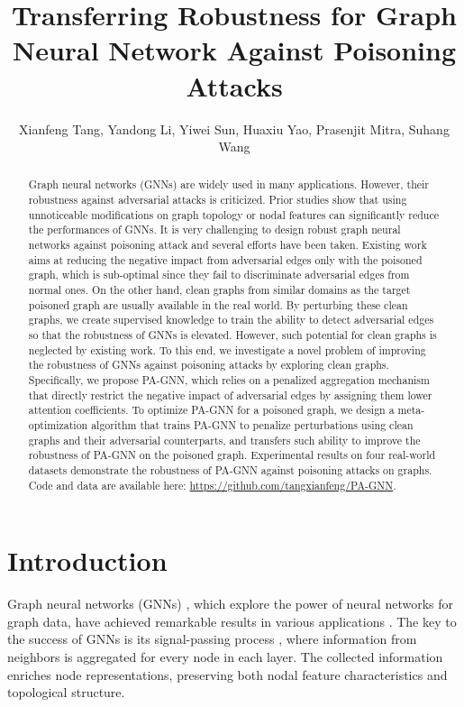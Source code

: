 \documentclass[sigconf]{acmart}
\title{Transferring Robustness for Graph Neural Network Against Poisoning Attacks}
\author{Xianfeng Tang, Yandong Li, Yiwei Sun, Huaxiu Yao, Prasenjit Mitra, Suhang Wang}\authornote{Corresponding Author.}
\affiliation{
\institution{Pennsylvania State University, University of Central Florida}
}
\affiliation{
  \institution{\{tangxianfeng, lyndon.leeseu\}@outlook.com  \{yus162, huy144, pum10, szw494\}@psu.edu}
}
\newcommand{\our}{{PA-GNN}\xspace}
\newcommand{\ours}{{PA-GNN}\xspace}
\begin{document}
\fancyhead{}
\begin{abstract}
Graph neural networks (GNNs) are widely used in many applications. 
However, their robustness against adversarial attacks is criticized. 
Prior studies show that using unnoticeable modifications on graph topology or nodal features can significantly reduce the performances of GNNs.
It is very challenging to design robust graph neural networks against poisoning attack and several efforts have been taken. 
Existing work aims at reducing the negative impact from adversarial edges only with the poisoned graph, which is sub-optimal since they fail to discriminate adversarial edges  from normal ones.
On the other hand, clean graphs from similar domains as the target poisoned graph are usually available in the real world. 
By perturbing these clean graphs, we create supervised knowledge to train the ability to detect adversarial edges so that the robustness of GNNs is elevated.
However, such potential for clean graphs is neglected by existing work.
To this end, we investigate a novel problem of improving the robustness of GNNs against poisoning attacks by exploring clean graphs.
Specifically, we propose \ours, which relies on a penalized aggregation mechanism that directly restrict the negative impact of adversarial edges by assigning them lower attention coefficients.
To optimize \ours for a poisoned graph, we design a meta-optimization algorithm that trains \ours to penalize perturbations using clean graphs and their adversarial counterparts, and transfers such ability to improve the robustness of \ours on the poisoned graph.
Experimental results on four real-world datasets demonstrate the robustness of \our against poisoning attacks on graphs.
Code and data are available here: \textcolor{blue}{\url{https://github.com/tangxianfeng/PA-GNN}}.
\end{abstract} 





\maketitle

\section{Introduction}
Graph neural networks (GNNs) \cite{kipf2016semi, hamilton2017inductive}, which explore the power of neural networks for graph data, have achieved remarkable results in various applications \cite{velivckovic2017graph,fan2019graph,huang2019online}.
The key to the success of GNNs is its signal-passing process \cite{wu2019simplifying}, where information from neighbors is aggregated for every node in each layer. The collected information enriches node representations, preserving both nodal feature characteristics and topological structure.
\end{document}
